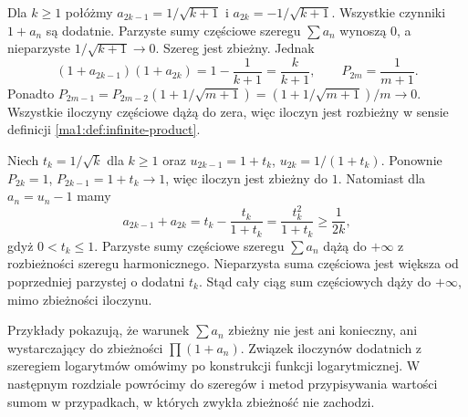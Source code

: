 \begin{przyklad}
\label{ma1:ex:series-converges-product-zero}
Dla $k\ge1$ połóżmy $a_{2k-1}=1/\sqrt{k+1}$ i $a_{2k}=-1/\sqrt{k+1}$. Wszystkie czynniki $1+a_n$ są dodatnie. Parzyste sumy częściowe szeregu $\sum a_n$ wynoszą $0$, a nieparzyste $1/\sqrt{k+1}\to0$. Szereg jest zbieżny. Jednak
\[
 (1+a_{2k-1})(1+a_{2k})=1-\frac1{k+1}
 =\frac{k}{k+1},
 \qquad P_{2m}=\frac1{m+1}.
\]
Ponadto $P_{2m-1}=P_{2m-2}(1+1/\sqrt{m+1})=(1+1/\sqrt{m+1})/m\to0$. Wszystkie iloczyny częściowe dążą do zera, więc iloczyn jest rozbieżny w sensie definicji \ref{ma1:def:infinite-product}.
\end{przyklad}

\begin{przyklad}
\label{ma1:ex:product-converges-series-diverges}
Niech $t_k=1/\sqrt{k}$ dla $k\ge1$ oraz $u_{2k-1}=1+t_k$, $u_{2k}=1/(1+t_k)$. Ponownie $P_{2k}=1$, $P_{2k-1}=1+t_k\to1$, więc iloczyn jest zbieżny do $1$. Natomiast dla $a_n=u_n-1$ mamy
\[
 a_{2k-1}+a_{2k}=t_k-\frac{t_k}{1+t_k}
 =\frac{t_k^2}{1+t_k}\ge\frac1{2k},
\]
gdyż $0<t_k\le1$. Parzyste sumy częściowe szeregu $\sum a_n$ dążą do $+\infty$ z rozbieżności szeregu harmonicznego. Nieparzysta suma częściowa jest większa od poprzedniej parzystej o dodatni $t_k$. Stąd cały ciąg sum częściowych dąży do $+\infty$, mimo zbieżności iloczynu.
\end{przyklad}

\begin{uwaga}
Przykłady pokazują, że warunek $\sum a_n$ zbieżny nie jest ani konieczny, ani wystarczający do zbieżności $\prod(1+a_n)$. Związek iloczynów dodatnich z szeregiem logarytmów omówimy po konstrukcji funkcji logarytmicznej. W następnym rozdziale powrócimy do szeregów i metod przypisywania wartości sumom w przypadkach, w których zwykła zbieżność nie zachodzi.
\end{uwaga}
